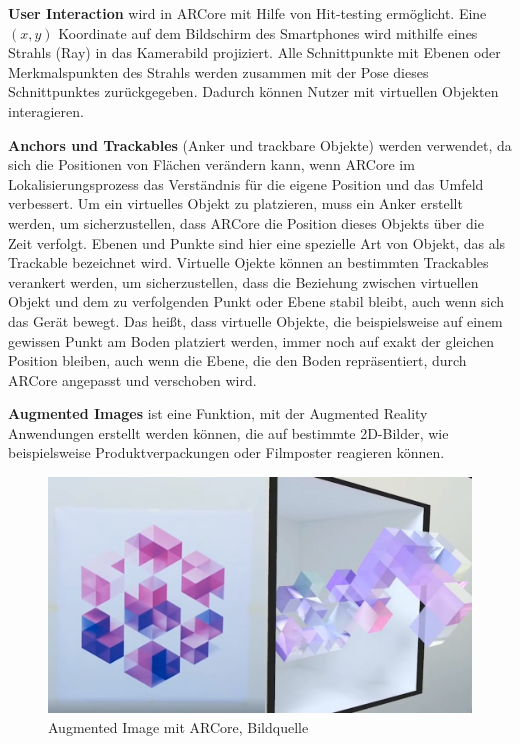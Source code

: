 \textbf{User Interaction} wird in ARCore mit Hilfe von \glqq Hit-testing\grqq{} ermöglicht. Eine $(x,y)$ Koordinate auf dem Bildschirm des Smartphones wird mithilfe eines Strahls (Ray) in das Kamerabild projiziert. Alle Schnittpunkte mit Ebenen oder Merkmalspunkten des Strahls werden zusammen mit der Pose dieses Schnittpunktes zurückgegeben. Dadurch können Nutzer mit virtuellen Objekten interagieren.

\textbf{Anchors und Trackables} (Anker und trackbare Objekte) werden verwendet, da sich die Positionen von Flächen verändern kann, wenn ARCore im Lokalisierungsprozess das Verständnis für die eigene Position und das Umfeld verbessert. Um ein virtuelles Objekt zu platzieren, muss ein Anker erstellt werden, um sicherzustellen, dass ARCore die Position dieses Objekts über die Zeit verfolgt. Ebenen und Punkte sind hier eine spezielle Art von Objekt, das als \glqq Trackable\grqq{} bezeichnet wird. Virtuelle Ojekte können an bestimmten Trackables verankert werden, um sicherzustellen, dass die Beziehung zwischen virtuellen Objekt und dem zu verfolgenden Punkt oder Ebene stabil bleibt, auch wenn sich das Gerät bewegt. Das heißt, dass virtuelle Objekte, die beispielsweise auf einem gewissen Punkt am Boden platziert werden, immer noch auf exakt der gleichen Position bleiben, auch wenn die Ebene, die den Boden repräsentiert, durch ARCore angepasst und verschoben wird.

\textbf{Augmented Images} ist eine Funktion, mit der Augmented Reality Anwendungen erstellt werden können, die auf bestimmte 2D-Bilder, wie beispielsweise Produktverpackungen oder Filmposter reagieren können.

\begin{figure}[H]
	\centering
	\includegraphics[scale=0.4]{augmented.png}
	\caption{Augmented Image mit ARCore, Bildquelle \cite{augmented_images}}
\end{figure} 

